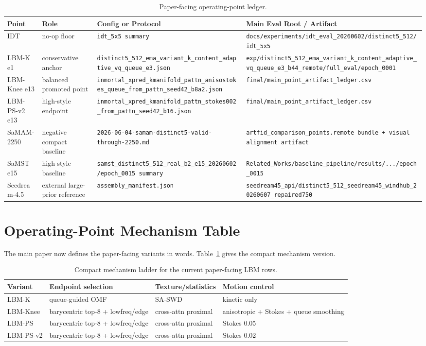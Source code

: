 \documentclass[letterpaper]{article}
\begin{document}
\begin{table}[t]
\centering
\caption{Paper-facing operating-point ledger.}
\small
\begin{tabular}{@{}llll@{}}
\toprule
Point & Role & Config or Protocol & Main Eval Root / Artifact \\
\midrule
IDT & no-op floor & \texttt{idt\_5x5 summary} & \texttt{docs/experiments/idt\_eval\_20260602/distinct5\_512/idt\_5x5} \\
LBM-K e1 & conservative anchor & \texttt{distinct5\_512\_ema\_variant\_k\_content\_adaptive\_vq\_queue\_e3.json} & \texttt{exp/distinct5\_512\_ema\_variant\_k\_content\_adaptive\_vq\_queue\_e3\_b44\_remote/full\_eval/epoch\_0001} \\
LBM-Knee e13 & balanced promoted point & \texttt{inmortal\_xpred\_kmanifold\_pattn\_anisostokes\_queue\_from\_pattn\_seed42\_b8a2.json} & \texttt{final/main\_point\_artifact\_ledger.csv} \\
LBM-PS-v2 e13 & high-style endpoint & \texttt{inmortal\_xpred\_kmanifold\_pattn\_stokes002\_from\_pattn\_seed42\_b16.json} & \texttt{final/main\_point\_artifact\_ledger.csv} \\
SaMAM-2250 & negative compact baseline & \texttt{2026-06-04-samam-distinct5-valid-through-2250.md} & \texttt{artfid\_comparison\_points.remote bundle + visual alignment artifact} \\
SaMST e15 & high-style baseline & \texttt{samst\_distinct5\_512\_real\_b2\_e15\_20260602/epoch\_0015 summary} & \texttt{Related\_Works/baseline\_pipeline/results/.../epoch\_0015} \\
Seedream-4.5 & external large-prior reference & \texttt{assembly\_manifest.json} & \texttt{seedream45\_api/distinct5\_512\_seedream45\_windhub\_20260607\_repaired750} \\
\bottomrule
\end{tabular}
\end{table}

\section{Operating-Point Mechanism Table}
The main paper now defines the paper-facing variants in words. Table~\ref{tab:variant_mech} gives the compact mechanism version.

\begin{table}[t]
\centering
\caption{Compact mechanism ladder for the current paper-facing LBM rows.}
\label{tab:variant_mech}
\small
\begin{tabular}{@{}l l l l@{}}
\toprule
Variant & Endpoint selection & Texture/statistics & Motion control \\
\midrule
LBM-K & queue-guided OMF & SA-SWD & kinetic only \\
LBM-Knee & barycentric top-8 + lowfreq/edge & cross-attn proximal & anisotropic + Stokes + queue smoothing \\
LBM-PS & barycentric top-8 + lowfreq/edge & cross-attn proximal & Stokes 0.05 \\
LBM-PS-v2 & barycentric top-8 + lowfreq/edge & cross-attn proximal & Stokes 0.02 \\
\bottomrule
\end{tabular}
\end{table}
\end{document}
